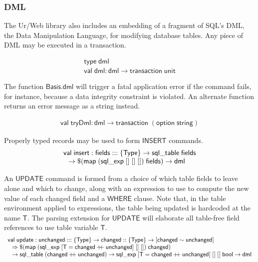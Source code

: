 \documentclass{article}
\newcommand{\mt}[1]{\mathsf{#1}}
\newcommand{\rc}{+ \hspace{-.075in} + \;}
\begin{document}
\subsubsection{DML}

The Ur/Web library also includes an embedding of a fragment of SQL's DML, the Data Manipulation Language, for modifying database tables.  Any piece of DML may be executed in a transaction.

$$\begin{array}{l}
  \mt{type} \; \mt{dml} \\
  \mt{val} \; \mt{dml} : \mt{dml} \to \mt{transaction} \; \mt{unit}
\end{array}$$

The function $\mt{Basis.dml}$ will trigger a fatal application error if the command fails, for instance, because a data integrity constraint is violated.  An alternate function returns an error message as a string instead.

$$\begin{array}{l}
  \mt{val} \; \mt{tryDml} : \mt{dml} \to \mt{transaction} \; (\mt{option} \; \mt{string})
\end{array}$$

Properly typed records may be used to form $\mt{INSERT}$ commands.
$$\begin{array}{l}
  \mt{val} \; \mt{insert} : \mt{fields} ::: \{\mt{Type}\} \to \mt{sql\_table} \; \mt{fields} \\
  \hspace{.1in} \to \$(\mt{map} \; (\mt{sql\_exp} \; [] \; [] \; []) \; \mt{fields}) \to \mt{dml}
\end{array}$$

An $\mt{UPDATE}$ command is formed from a choice of which table fields to leave alone and which to change, along with an expression to use to compute the new value of each changed field and a $\mt{WHERE}$ clause.  Note that, in the table environment applied to expressions, the table being updated is hardcoded at the name $\mt{T}$.  The parsing extension for $\mt{UPDATE}$ will elaborate all table-free field references to use table variable $\mt{T}$.
$$\begin{array}{l}
  \mt{val} \; \mt{update} : \mt{unchanged} ::: \{\mt{Type}\} \to \mt{changed} :: \{\mt{Type}\} \to [\mt{changed} \sim \mt{unchanged}] \\
  \hspace{.1in} \Rightarrow \$(\mt{map} \; (\mt{sql\_exp} \; [\mt{T} = \mt{changed} \rc \mt{unchanged}] \; [] \; []) \; \mt{changed}) \\
  \hspace{.1in} \to \mt{sql\_table} \; (\mt{changed} \rc \mt{unchanged}) \to \mt{sql\_exp} \; [\mt{T} = \mt{changed} \rc \mt{unchanged}] \; [] \; [] \; \mt{bool} \to \mt{dml}
\end{array}$$
\end{document}
